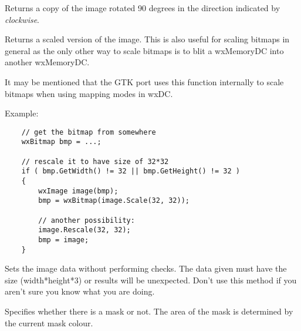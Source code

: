 
Returns a copy of the image rotated 90 degrees in the direction
indicated by {\it clockwise}.

\label{wximagescale}


Returns a scaled version of the image. This is also useful for
scaling bitmaps in general as the only other way to scale bitmaps
is to blit a wxMemoryDC into another wxMemoryDC.

It may be mentioned that the GTK port uses this function internally
to scale bitmaps when using mapping modes in wxDC. 

Example:

\begin{verbatim}
    // get the bitmap from somewhere
    wxBitmap bmp = ...;

    // rescale it to have size of 32*32
    if ( bmp.GetWidth() != 32 || bmp.GetHeight() != 32 )
    {
        wxImage image(bmp);
        bmp = wxBitmap(image.Scale(32, 32));

        // another possibility:
        image.Rescale(32, 32);
        bmp = image;
    }

\end{verbatim}



\label{wximagesetdata}


Sets the image data without performing checks. The data given must have
the size (width*height*3) or results will be unexpected. Don't use this
method if you aren't sure you know what you are doing.

\label{wximagesetmask}


Specifies whether there is a mask or not. The area of the mask is determined by the current mask colour.

\label{wximagesetmaskcolour}


